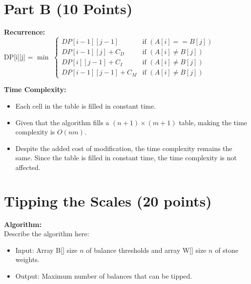 \documentclass{article}[12pt]
\begin{document}
\newpage
\section{Part B (10 Points)}
\noindent\textbf{Recurrence:} \\
DP[i][j] = $\min$
$\begin{cases}
  DP[i-1][j-1] & \text{if } (A[i] == B[j])\\
  DP[i-1][j] + C_D & \text{if } (A[i] \neq B[j])\\
  DP[i][j-1] + C_I & \text{if } (A[i] \neq B[j])\\
  DP[i-1][j-1] + C_M & \text{if } (A[i] \neq B[j])
\end{cases}$

\noindent\textbf{Time Complexity:} \\
\begin{itemize}
  \item Each cell in the table is filled in constant time.
  \item Given that the algorithm fills a $(n+1) \times (m+1)$ table, 
    making the time complexity is $O(nm)$.
  \item Despite the added cost of modification, the time complexity remains the same.
    Since the table is filled in constant time, the time complexity is not affected.
\end{itemize}

\newpage
\section{Tipping the Scales (20 points)}
\noindent\textbf{Algorithm:} \\
Describe the algorithm here: \\
\begin{itemize}
  \item Input: Array B[] size $n$ of balance thresholds and array W[] size $n$ of stone weights.
  \item Output: Maximum number of balances that can be tipped.
\end{itemize}
\end{document}
